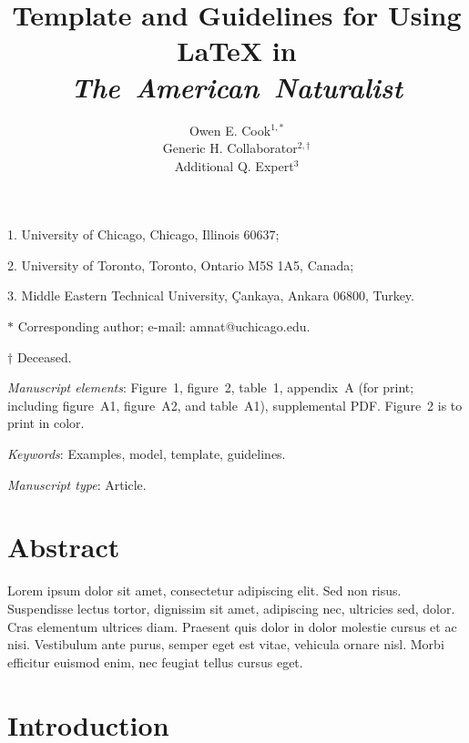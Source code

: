 ﻿\documentclass[11pt]{article}
\title{Template and Guidelines for Using \LaTeX{} in \textit{The~American~Naturalist} }
\author{Owen E. Cook$^{1,\ast}$ \\ 
Generic H. Collaborator$^{2,\dag}$ \\ 
Additional Q. Expert$^{3}$}
\date{}
\begin{document}
\maketitle

\noindent{} 1. University of Chicago, Chicago, Illinois 60637;

\noindent{} 2. University of Toronto, Toronto, Ontario M5S 1A5, Canada;

\noindent{} 3. Middle Eastern Technical University, Çankaya, Ankara 06800, Turkey.

\noindent{} $\ast$ Corresponding author; e-mail: amnat@uchicago.edu.

\noindent{} $\dag$ Deceased.

\bigskip

\textit{Manuscript elements}: Figure~1, figure~2, table~1, appendix~A (for print; including figure~A1, figure~A2, and table~A1), supplemental PDF. Figure~2 is to print in color.

\bigskip

\textit{Keywords}: Examples, model, template, guidelines.

\bigskip

\textit{Manuscript type}: Article. %

\bigskip


\linenumbers{}
\modulolinenumbers[1]

\newpage{}

\section*{Abstract}

Lorem ipsum dolor sit amet, consectetur adipiscing elit. Sed non risus. Suspendisse lectus tortor, dignissim sit amet, adipiscing nec, ultricies sed, dolor. Cras elementum ultrices diam. Praesent quis dolor in dolor molestie cursus et ac nisi. Vestibulum ante purus, semper eget est vitae, vehicula ornare nisl. Morbi efficitur euismod enim, nec feugiat tellus cursus eget. 

\newpage{}

\section*{Introduction}
\end{document}
